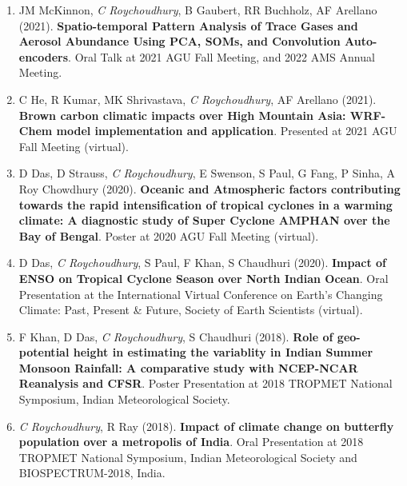 \documentclass[margin,line]{resume}
\begin{document}
\begin{resume}
\begin{enumerate}[topsep=1pt, partopsep=1pt, itemsep=0.5pt, parsep=0.1pt, leftmargin=15pt,label=\arabic*.]
			\item JM McKinnon, \textit{C Roychoudhury}, B Gaubert, RR Buchholz, AF Arellano (2021).
			\textbf{Spatio-temporal Pattern Analysis of Trace Gases and Aerosol Abundance Using PCA, SOMs, and Convolution Auto-encoders}.
			Oral Talk at 2021 AGU Fall Meeting, and 2022 AMS Annual Meeting.
			
			\item C He, R Kumar, MK Shrivastava, \textit{C Roychoudhury}, AF Arellano (2021).
			\textbf{Brown carbon climatic impacts over High Mountain Asia: WRF-Chem model implementation and application}.
			Presented at 2021 AGU Fall Meeting (virtual).
			
			\item D Das, D Strauss, \textit{C Roychoudhury}, E Swenson, S Paul, G Fang, P Sinha, A Roy Chowdhury (2020).
			\textbf{Oceanic and Atmospheric factors contributing towards the rapid intensification of tropical cyclones in a warming climate: A diagnostic study of Super Cyclone AMPHAN over the Bay of Bengal}.
			Poster at 2020 AGU Fall Meeting (virtual).
			
			\item D Das, \textit{C Roychoudhury}, S Paul, F Khan, S Chaudhuri (2020). \textbf{Impact of ENSO on Tropical Cyclone Season over North Indian Ocean}. Oral Presentation at the International Virtual Conference on Earth's Changing Climate: Past, Present \& Future, Society of Earth Scientists (virtual).
				
			\item F Khan, D Das, \textit{C Roychoudhury}, S Chaudhuri (2018).		\textbf{Role of geo-potential height in estimating the variablity in Indian Summer Monsoon Rainfall: A comparative study with NCEP-NCAR Reanalysis and CFSR}. Poster Presentation at  %
			2018 TROPMET National Symposium, Indian Meteorological Society.
			
				\item \textit{C Roychoudhury}, R Ray (2018).
			\textbf{Impact of climate change on butterfly population over a metropolis of India}.
				Oral Presentation at %
				2018 TROPMET National Symposium, Indian Meteorological Society and BIOSPECTRUM-2018, India.
			

\end{enumerate}
\end{resume}
\end{document}
